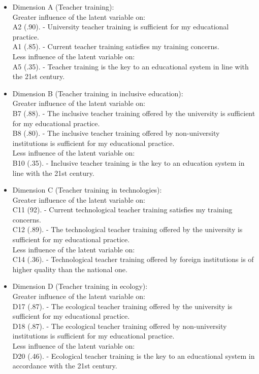 \documentclass[english]{textolivre}
\begin{document}
\begin{itemize}
    \item Dimension A (Teacher training): 
    \\ Greater influence of the latent variable on:
    \\ A2 (.90). - University teacher training is sufficient for my educational practice.
    \\ A1 (.85). - Current teacher training satisfies my training concerns.
    \\ Less influence of the latent variable on:
    \\ A5 (.35). - Teacher training is the key to an educational system in line with the 21st century.
    
    \item Dimension B (Teacher training in inclusive education): 
    \\ Greater influence of the latent variable on:
    \\ B7 (.88). - The inclusive teacher training offered by the university is sufficient for my educational practice.
    \\ B8 (.80). - The inclusive teacher training offered by non-university institutions is sufficient for my educational practice.
    \\ Less influence of the latent variable on:
    \\ B10 (.35). - Inclusive teacher training is the key to an education system in line with the 21st century.
    
    \item Dimension C (Teacher training in technologies):
    \\ Greater influence of the latent variable on:
    \\ C11 (92). - Current technological teacher training satisfies my training concerns.
    \\ C12 (.89). - The technological teacher training offered by the university is sufficient for my educational practice.
    \\ Less influence of the latent variable on:
    \\ C14 (.36). - Technological teacher training offered by foreign institutions is of higher quality than the national one.
    
    \item Dimension D (Teacher training in ecology):
    \\ Greater influence of the latent variable on:
    \\ D17 (.87). - The ecological teacher training offered by the university is sufficient for my educational practice.
    \\ D18 (.87). - The ecological teacher training offered by non-university institutions is sufficient for my educational practice.
    \\ Less influence of the latent variable on:
    \\ D20 (.46). - Ecological teacher training is the key to an educational system in accordance with the 21st century.
    

\end{itemize}
\end{document}
